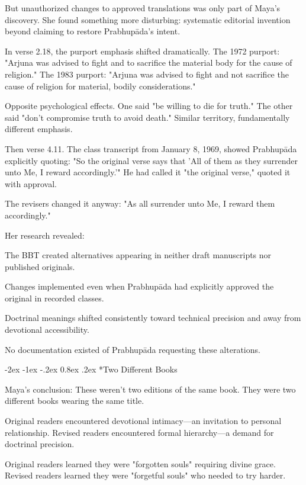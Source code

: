 \documentclass[12pt,twoside]{book}
\makeatletter
\let\oldsubsection\subsection
\renewcommand{\subsection}[1]{\needspace{3\baselineskip}\oldsubsection{#1}}
\renewcommand\subsection{\@startsection{subsection}{2}{\z@}%
{-2ex \@plus -1ex \@minus -.2ex}%
{0.8ex \@plus .2ex}%
{\normalfont\large\bfseries}}
\makeatother
\begin{document}
But unauthorized changes to approved translations was only part of Maya's discovery. She found something more disturbing: systematic editorial invention beyond claiming to restore Prabhupāda's intent.

In verse 2.18, the purport emphasis shifted dramatically. The 1972 purport: "Arjuna was advised to fight and to sacrifice the material body for the cause of religion." The 1983 purport: "Arjuna was advised to fight and not sacrifice the cause of religion for material, bodily considerations."

Opposite psychological effects. One said "be willing to die for truth." The other said "don't compromise truth to avoid death." Similar territory, fundamentally different emphasis.

Then verse 4.11. The class transcript from January 8, 1969, showed Prabhupāda explicitly quoting: "So the original verse says that 'All of them as they surrender unto Me, I reward accordingly.'" He had called it "the original verse," quoted it with approval.

The revisers changed it anyway: "As all surrender unto Me, I reward them accordingly."

Her research revealed:

The BBT created alternatives appearing in neither draft manuscripts nor published originals.

Changes implemented even when Prabhupāda had explicitly approved the original in recorded classes.

Doctrinal meanings shifted consistently toward technical precision and away from devotional accessibility.

No documentation existed of Prabhupāda requesting these alterations.


\vspace{0.1cm}
\subsection*{Two Different Books}

Maya's conclusion: These weren't two editions of the same book. They were two different books wearing the same title.

Original readers encountered devotional intimacy—an invitation to personal relationship. Revised readers encountered formal hierarchy—a demand for doctrinal precision.

Original readers learned they were "forgotten souls" requiring divine grace. Revised readers learned they were "forgetful souls" who needed to try harder.
\end{document}
